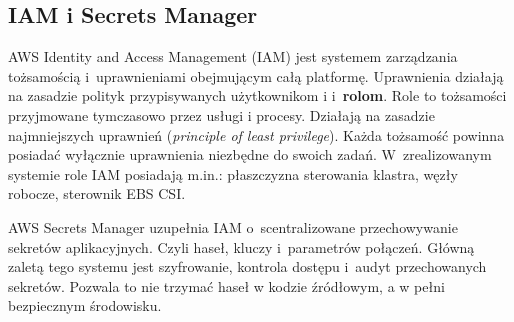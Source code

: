 \subsection{IAM i Secrets Manager}
\label{subsec:iam-secrets-manager}

AWS Identity and Access Management (IAM) jest systemem zarządzania tożsamością i~uprawnieniami obejmującym całą
platformę. Uprawnienia działają na zasadzie polityk przypisywanych użytkownikom i i~\textbf{rolom}.
Role to tożsamości przyjmowane tymczasowo przez usługi i procesy. Działają na zasadzie najmniejszych 
uprawnień (\emph{principle of least privilege}). Każda tożsamość powinna posiadać wyłącznie uprawnienia niezbędne do swoich zadań. 
W~zrealizowanym systemie role IAM posiadają m.in.: płaszczyzna sterowania klastra, węzły robocze, sterownik EBS CSI.

AWS Secrets Manager uzupełnia IAM o~scentralizowane przechowywanie sekretów aplikacyjnych. Czyli haseł, kluczy
i~parametrów połączeń. Główną zaletą tego systemu jest szyfrowanie, kontrola dostępu i~audyt przechowanych sekretów.
Pozwala to nie trzymać haseł w kodzie źródłowym, a w pełni bezpiecznym środowisku.
